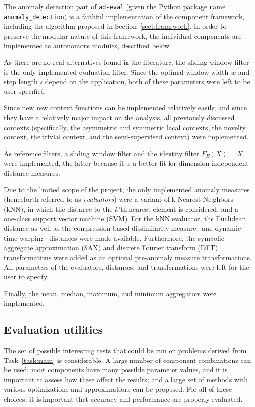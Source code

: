 The anomaly detection part of \texttt{ad-eval} (given the Python package name \texttt{anomaly\_detection}) is a faithful implementation of the component framework, including the algorithm proposed in Section~\ref{sect:framework}. In order to preserve the modular nature of this framework, the individual components are implemented as autonomous modules, described below.

As there are no real alternatives found in the literature, the sliding window filter is the only implemented evaluation filter. Since the optimal window width $w$ and step length $s$ depend on the application, both of these parameters were left to be user-specified.

Since new new context functions can be implemented relatively easily, and since they have a relatively major impact on the analysis, all previously discussed contexts (specifically, the asymmetric and symmetric local contexts, the novelty context, the trivial context, and the semi-supervised context) were implemented.

As reference filters, a sliding window filter and the identity filter $F_E(X)=X$ were implemented, the latter because it is a better fit for dimension-independent distance measures.

Due to the limited scope of the project, the only implemented anomaly measures (henceforth referred to as \emph{evaluators}) were a variant of k-Nearest Neighbors (kNN), in which the distance to the $k$'th nearest element is considered, and a one-class support vector machine (SVM). For the kNN evaluator, the Euclidean distance as well as the compression-based dissimilarity measure~\cite{keogh2} and dynamic time warping~\cite{dtw} distances were made available. Furthermore, the symbolic aggregate approximation (SAX) and discrete Fourier transform (DFT) transformations were added as an optional pre-anomaly measure transformations. All parameters of the evaluators, distances, and transformations were left for the user to specify.

Finally, the mean, median, maximum, and minimum aggregators were implemented.

\subsection{Evaluation utilities}
\label{sect:evaluation_package}

The set of possible interesting tests that could be run on problems derived from Task~\ref{task:main} is considerable. A large number of component combinations can be used; most components have many possible parameter values, and it is important to assess how these affect the results; and a large set of methods with various optimizations and approximations can be proposed. For all of these choices, it is important that accuracy and performance are properly evaluated.


